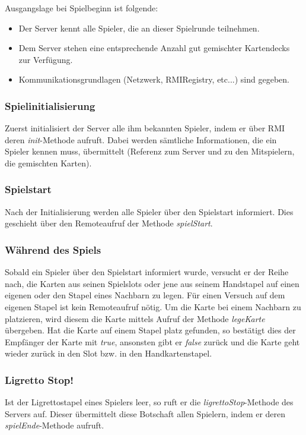 Ausgangslage bei Spielbeginn ist folgende:
\begin{itemize}
	\item Der Server kennt alle Spieler, die an dieser Spielrunde teilnehmen.
	\item Dem Server stehen eine entsprechende Anzahl gut gemischter Kartendecks zur Verfügung.
	\item Kommunikationsgrundlagen (Netzwerk, RMIRegistry, etc...) sind gegeben.
\end{itemize}

\subsubsection{Spielinitialisierung}
Zuerst initialisiert der Server alle ihm bekannten Spieler, indem er über RMI deren \textit{init}-Methode aufruft. Dabei werden sämtliche Informationen, die ein Spieler kennen muss, übermittelt (Referenz zum Server und zu den Mitspielern, die gemischten Karten).

\subsubsection{Spielstart}
Nach der Initialisierung werden alle Spieler über den Spielstart informiert. Dies geschieht über den Remoteaufruf der Methode \textit{spielStart}.

\subsubsection{Während des Spiels}
Sobald ein Spieler über den Spielstart informiert wurde, versucht er der Reihe nach, die Karten aus seinen Spielslots oder jene aus seinem Handstapel auf einen eigenen oder den Stapel eines Nachbarn zu legen. Für einen Versuch auf dem eigenen Stapel ist kein Remoteaufruf nötig. Um die Karte bei einem Nachbarn zu platzieren, wird diesem die Karte mittels Aufruf der Methode \textit{legeKarte} übergeben. Hat die Karte auf einem Stapel platz gefunden, so bestätigt dies der Empfänger der Karte mit \textit{true}, ansonsten gibt er \textit{false} zurück und die Karte geht wieder zurück in den Slot bzw. in den Handkartenstapel.

\subsubsection{Ligretto Stop!}
Ist der Ligrettostapel eines Spielers leer, so ruft er die \textit{ligrettoStop}-Methode des Servers auf. Dieser übermittelt diese Botschaft allen Spielern, indem er deren \textit{spielEnde}-Methode aufruft.

